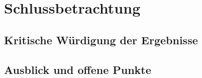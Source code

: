 \chapter{Schlussbetrachtung}
\section{Kritische W\"urdigung der Ergebnisse}
\section{Ausblick und offene Punkte}
